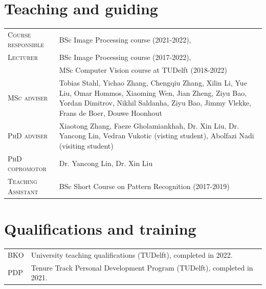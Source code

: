 \documentclass[a4paper, oneside, final]{scrartcl}
\begin{document}
\begin{center}
		\section{Teaching and guiding}
        \begin{tabular}{p{3.5cm}@{\hskip 0.3in}p{12.3cm}}
			\textsc{Course responsible}		    & BSc Image Processing course (2021-2022),\\
			\textsc{Lecturer}		            & BSc Image Processing course (2017-2022),\\
                                                & MSc Computer Vision course at TUDelft (2018-2022)\\
			\textsc{MSc adviser}                & Tobias Stahl, Yichao Zhang, Chengqiu Zhang, Xilin Li, Yue Liu, Omar Hommos, Xiaoming Wen, Jian Zheng, Ziyu Bao, Yordan Dimitrov, Nikhil Saldanha, Ziyu Bao, Jimmy Vlekke, Frans de Boer, Douwe Hoonhout\\
			\textsc{PhD adviser}                & Xiaotong Zhang, Faeze Gholamiankhah, Dr. Xin Liu, Dr. Yancong Lin, Vedran Vukotic (visting student), Abolfazi Nadi (visiting student)\\ 
			\textsc{PhD copromotor}             & Dr. Yancong Lin, Dr. Xin Liu\\ 
            \textsc{Teaching Assistant}         & BSc Short Course on Pattern Recognition (2017-2019)\\
		\end{tabular}

		\section{Qualifications and training}
        \begin{tabular}{p{3.5cm}@{\hskip 0.3in}p{12.3cm}}
            \textsc{BKO}                   & University teaching qualifications (TUDelft), completed in 2022.\\
            \textsc{PDP}                   & Tenure Track Personal Development Program (TUDelft), completed in 2021.\\
		\end{tabular}


\end{center}
\end{document}
